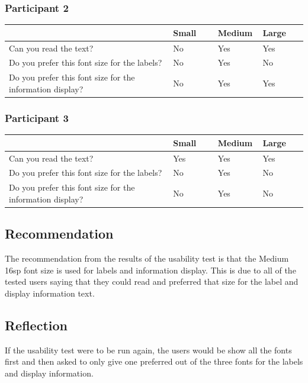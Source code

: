 \documentclass[11pt,english,numbers=endperiod,parskip=half]{scrartcl}
\begin{document}
\subsubsection{Participant 2}
\begin{table}[H]
	\begin{tabular}{| p{0.55\linewidth} | p{0.15\linewidth} | p{0.15\linewidth} | p{0.15 \linewidth} |}
		\hline
			&	Small	&	Medium	&	Large \\ \hline
		Can you read the text?	& No & Yes	& Yes \\ \hline
		Do you prefer this font size for the labels? & No & Yes & No \\ \hline
		Do you prefer this font size for the information display? & No & Yes & Yes \\
		\hline
	\end{tabular}
\end{table}

\subsubsection{Participant 3}
\begin{table}[H]
	\begin{tabular}{| p{0.55\linewidth} | p{0.15\linewidth} | p{0.15\linewidth} | p{0.15 \linewidth} |}
		\hline
			&	Small	&	Medium	&	Large \\ \hline
		Can you read the text?	& Yes	& Yes	& Yes \\ \hline
		Do you prefer this font size for the labels? & No & Yes & No \\ \hline
		Do you prefer this font size for the information display? & No & Yes & No \\
		\hline
	\end{tabular}
\end{table}

\subsection{Recommendation}
\raggedright
The recommendation from the results of the usability test is that the Medium 16sp font size is used for labels and information display. This is due to all of the tested users saying that they could read and preferred that size for the label and display information text.

\subsection{Reflection}
\raggedright
If the usability test were to be run again, the users would be show all the fonts first and then asked to only give one preferred out of the three fonts for the labels and display information.
\end{document}
